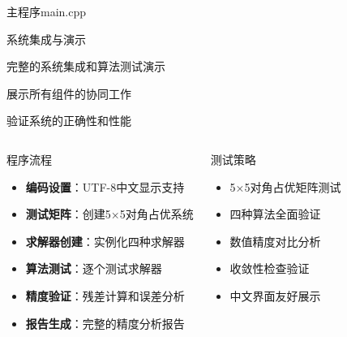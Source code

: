 \documentclass[UTF8,aspectratio=169]{beamer}
\begin{document}
\begin{frame}{主程序main.cpp}
    \begin{ytublock}{系统集成与演示}
        \item 完整的系统集成和算法测试演示
        \item 展示所有组件的协同工作
        \item 验证系统的正确性和性能
    \end{ytublock}

    \begin{columns}
        \begin{block}{程序流程}
            \begin{itemize}
                \item \textbf{编码设置}：UTF-8中文显示支持
                \item \textbf{测试矩阵}：创建5×5对角占优系统
                \item \textbf{求解器创建}：实例化四种求解器
                \item \textbf{算法测试}：逐个测试求解器
                \item \textbf{精度验证}：残差计算和误差分析
                \item \textbf{报告生成}：完整的精度分析报告
            \end{itemize}
        \end{block}

        \begin{block}{测试策略}
            \begin{itemize}
                \item 5×5对角占优矩阵测试
                \item 四种算法全面验证
                \item 数值精度对比分析
                \item 收敛性检查验证
                \item 中文界面友好展示
            \end{itemize}
        \end{block}
    \end{columns}
\end{frame}
\end{document}
